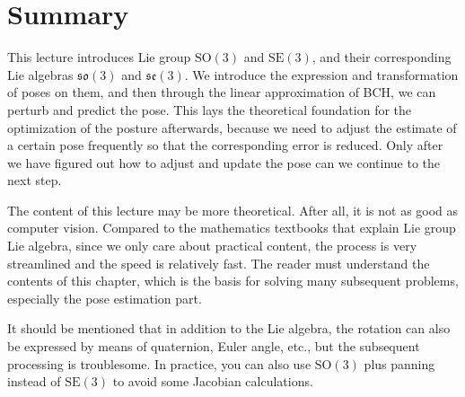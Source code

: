 \section{Summary}
This lecture introduces Lie group $\mathrm{SO}(3)$ and $\mathrm{SE}(3)$, and their corresponding Lie algebras $\mathfrak{so}(3)$ and $\mathfrak{se }(3)$. We introduce the expression and transformation of poses on them, and then through the linear approximation of BCH, we can perturb and predict the pose. This lays the theoretical foundation for the optimization of the posture afterwards, because we need to adjust the estimate of a certain pose frequently so that the corresponding error is reduced. Only after we have figured out how to adjust and update the pose can we continue to the next step.

The content of this lecture may be more theoretical. After all, it is not as good as computer vision. Compared to the mathematics textbooks that explain Lie group Lie algebra, since we only care about practical content, the process is very streamlined and the speed is relatively fast. The reader must understand the contents of this chapter, which is the basis for solving many subsequent problems, especially the pose estimation part.

It should be mentioned that in addition to the Lie algebra, the rotation can also be expressed by means of quaternion, Euler angle, etc., but the subsequent processing is troublesome. In practice, you can also use $\mathrm{SO}(3)$ plus panning instead of $\mathrm{SE}(3)$ to avoid some Jacobian calculations.
